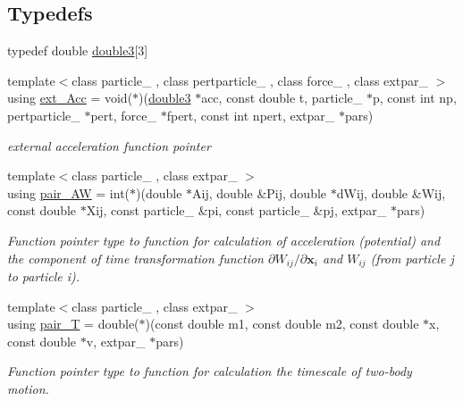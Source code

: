 \subsection*{Typedefs}
\begin{DoxyCompactItemize}
\item 
typedef double \hyperlink{namespaceARC_affb4fe085f3ea94b378be8bc9382a75d}{double3}\mbox{[}3\mbox{]}
\item 
{\footnotesize template$<$class particle\+\_\+ , class pertparticle\+\_\+ , class force\+\_\+ , class extpar\+\_\+ $>$ }\\using \hyperlink{namespaceARC_aa423c7d6aff9481c040a20b3c5c6ff4e}{ext\+\_\+\+Acc} = void($\ast$)(\hyperlink{namespaceARC_affb4fe085f3ea94b378be8bc9382a75d}{double3} $\ast$acc, const double t, particle\+\_\+ $\ast$p, const int np, pertparticle\+\_\+ $\ast$pert, force\+\_\+ $\ast$fpert, const int npert, extpar\+\_\+ $\ast$pars)
\begin{DoxyCompactList}\small\item\em external acceleration function pointer \end{DoxyCompactList}\item 
{\footnotesize template$<$class particle\+\_\+ , class extpar\+\_\+ $>$ }\\using \hyperlink{namespaceARC_afc1f57a75859038cbd2492366fd1849c}{pair\+\_\+\+AW} = int($\ast$)(double $\ast$Aij, double \&Pij, double $\ast$d\+Wij, double \&Wij, const double $\ast$Xij, const particle\+\_\+ \&pi, const particle\+\_\+ \&pj, extpar\+\_\+ $\ast$pars)
\begin{DoxyCompactList}\small\item\em Function pointer type to function for calculation of acceleration (potential) and the component of time transformation function $\partial W_{ij}/\partial \mathbf{x}_i$ and $W_{ij}$ (from particle j to particle i). \end{DoxyCompactList}\item 
{\footnotesize template$<$class particle\+\_\+ , class extpar\+\_\+ $>$ }\\using \hyperlink{namespaceARC_af6dbf77cf2968752315f7712eb2515a3}{pair\+\_\+T} = double($\ast$)(const double m1, const double m2, const double $\ast$x, const double $\ast$v, extpar\+\_\+ $\ast$pars)
\begin{DoxyCompactList}\small\item\em Function pointer type to function for calculation the timescale of two-\/body motion. \end{DoxyCompactList}\end{DoxyCompactItemize}


